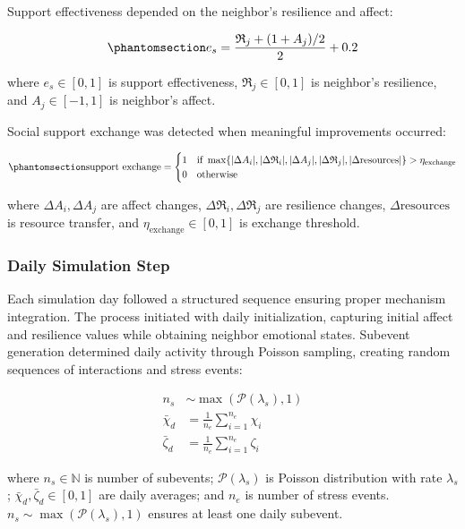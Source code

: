 \documentclass[
  letterpaper,
  DIV=11,
  numbers=noendperiod]{scrartcl}
\begin{document}
Support effectiveness depended on the neighbor's resilience and affect:

\begin{equation}\phantomsection\label{eq-support-effectiveness}{
e_s = \frac{\mathfrak{R}_j + (1 + A_j)/2}{2} + 0.2
}\end{equation}

where \(e_s \in [0,1]\) is support effectiveness,
\(\mathfrak{R}_j \in [0,1]\) is neighbor's resilience, and
\(A_j \in [-1,1]\) is neighbor's affect.

Social support exchange was detected when meaningful improvements
occurred:

\begin{equation}\phantomsection\label{eq-support-exchange}{
\mathrm{support\ exchange} = \begin{cases}
1 & \text{if } \max\{|\Delta A_i|, |\Delta \mathfrak{R}_i|, |\Delta A_j|, |\Delta \mathfrak{R}_j|, |\Delta \text{resources}|\} > \eta_{\text{exchange}} \\
0 & \text{otherwise}
\end{cases}
}\end{equation}

where \(\Delta A_i, \Delta A_j\) are affect changes,
\(\Delta \mathfrak{R}_i, \Delta \mathfrak{R}_j\) are resilience changes,
\(\Delta \text{resources}\) is resource transfer, and
\(\eta_{\text{exchange}} \in [0,1]\) is exchange threshold.

\subsubsection{Daily Simulation Step}\label{daily-simulation-step}

Each simulation day followed a structured sequence ensuring proper
mechanism integration. The process initiated with daily initialization,
capturing initial affect and resilience values while obtaining neighbor
emotional states. Subevent generation determined daily activity through
Poisson sampling, creating random sequences of interactions and stress
events:

\begin{align}
n_s &\sim \max(\mathcal{P}(\lambda_s), 1) \\
\bar{\chi}_d &= \frac{1}{n_e}\sum_{i=1}^{n_e} \chi_i \\
\bar{\zeta}_d &= \frac{1}{n_e}\sum_{i=1}^{n_e} \zeta_i
\label{eq-daily-integration}
\end{align}

where \(n_s \in \mathbb{N}\) is number of subevents;
\(\mathcal{P}(\lambda_s)\) is Poisson distribution with rate
\(\lambda_s\); \(\bar{\chi}_d, \bar{\zeta}_d \in [0,1]\) are daily
averages; and \(n_e\) is number of stress events.
\(n_s \sim \max(\mathcal{P}(\lambda_s), 1)\) ensures at least one daily
subevent.
\end{document}
